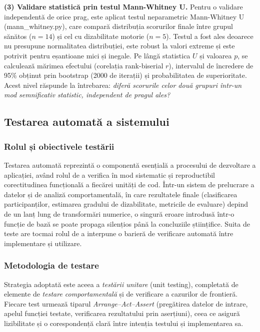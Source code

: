 \documentclass[12pt,a4paper]{report}
\theoremstyle{definition}
\theoremstyle{remark}
\begin{document}
\textbf{(3) Validare statistică prin testul Mann-Whitney U.} Pentru o validare independentă de orice prag, este aplicat testul neparametric Mann-Whitney U (mann\_whitney.py), care compară distribuția scorurilor finale între grupul sănătos ($n=14$) și cel cu dizabilitate motorie ($n=5$). Testul a fost ales deoarece nu presupune normalitatea distribuției, este robust la valori extreme și este potrivit pentru eșantioane mici și inegale. Pe lângă statistica $U$ și valoarea $p$, se calculează mărimea efectului (corelația rank-biserial $r$), intervalul de încredere de 95\% obținut prin bootstrap (2000 de iterații) și probabilitatea de superioritate. Acest nivel răspunde la întrebarea: \textit{diferă scorurile celor două grupuri într-un mod semnificativ statistic, independent de pragul ales?}

\subsection{Testarea automată a sistemului}
\label{sec:testare}

\subsubsection{Rolul și obiectivele testării}

Testarea automată reprezintă o componentă esențială a procesului de dezvoltare
a aplicației, având rolul de a verifica în mod sistematic și reproductibil
corectitudinea funcțională a fiecărei unități de cod. Într-un sistem de
prelucrare a datelor și de analiză comportamentală, în care rezultatele finale
(clasificarea participanților, estimarea gradului de dizabilitate, metricile de
evaluare) depind de un lanț lung de transformări numerice, o singură eroare
introdusă într-o funcție de bază se poate propaga silențios până la concluziile
științifice. Suita de teste are tocmai rolul de a interpune o barieră de
verificare automată între implementare și utilizare.

\subsubsection{Metodologia de testare}

Strategia adoptată este aceea a \emph{testării unitare} (unit testing),
completată de elemente de \emph{testare comportamentală} și de verificare a
cazurilor de frontieră. Fiecare test urmează tiparul \emph{Arrange--Act--Assert}
(pregătirea datelor de intrare, apelul funcției testate, verificarea
rezultatului prin aserțiuni), ceea ce asigură lizibilitate și o corespondență
clară între intenția testului și implementarea sa.
\end{document}
